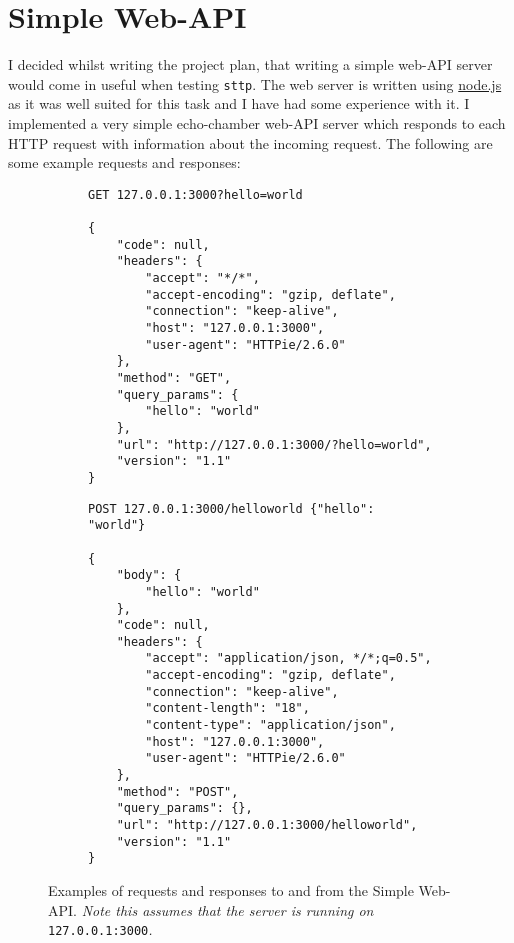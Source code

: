 \section{Simple Web-API}
\label{sec:simple-web-api}

I decided whilst writing the project plan, that writing a simple web-API server would come in useful when testing \verb|sttp|. The web server is written using \href{https://nodejs.org/en/}{node.js} as it was well suited for this task and I have had some experience with it. I implemented a very simple echo-chamber web-API server which responds to each HTTP request with information about the incoming request. The following are some example requests and responses:

\begin{figure}[H]
    \centering
    \begin{subfigure}{.5\textwidth}
        \centering
        \begin{mdframed}
            \begin{Verbatim}[fontsize=\scriptsize]
GET 127.0.0.1:3000?hello=world

{
    "code": null,
    "headers": {
        "accept": "*/*",
        "accept-encoding": "gzip, deflate",
        "connection": "keep-alive",
        "host": "127.0.0.1:3000",
        "user-agent": "HTTPie/2.6.0"
    },
    "method": "GET",
    "query_params": {
        "hello": "world"
    },
    "url": "http://127.0.0.1:3000/?hello=world",
    "version": "1.1"
}
            \end{Verbatim}
        \end{mdframed}
    \end{subfigure}%
    \begin{subfigure}{.5\textwidth}
        \centering
        \begin{mdframed}            
            \begin{Verbatim}[fontsize=\scriptsize]
POST 127.0.0.1:3000/helloworld {"hello": "world"}

{
    "body": {
        "hello": "world"
    },
    "code": null,
    "headers": {
        "accept": "application/json, */*;q=0.5",
        "accept-encoding": "gzip, deflate",
        "connection": "keep-alive",
        "content-length": "18",
        "content-type": "application/json",
        "host": "127.0.0.1:3000",
        "user-agent": "HTTPie/2.6.0"
    },
    "method": "POST",
    "query_params": {},
    "url": "http://127.0.0.1:3000/helloworld",
    "version": "1.1"
}
            \end{Verbatim}
        \end{mdframed}
    \end{subfigure}
    \cprotect\caption{\label{fig:1.2}Examples of requests and responses to and from the Simple Web-API. \textit{Note this assumes that the server is running on }\verb|127.0.0.1:3000|\textit{.}}
\end{figure}
